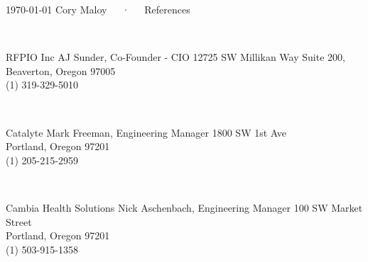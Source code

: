\documentclass[11pt, a4paper]{setup-class}
\begin{document}
\makecvheader[R]

\makecvfooter
  {\today}
  {Cory Maloy~~~·~~~References}
  {}

\makelettertitle

\begin{cvletter}


  ~

  \cventry
  {RFPIO Inc}
  {AJ Sunder, Co-Founder - CIO}
  {}
  {}
  {
	  12725 SW Millikan Way Suite 200, \\
	  Beaverton, Oregon 97005 \\
	  (1) 319-329-5010 \\
  }


  ~

  \cventry
  {Catalyte}
  {Mark Freeman, Engineering Manager}
  {}
  {}
  {
	  1800 SW 1st Ave \\
	  Portland, Oregon 97201 \\
	  (1) 205-215-2959 \\
  }


  ~

  \cventry
  {Cambia Health Solutions}
  {Nick Aschenbach, Engineering Manager}
  {}
  {}
  {
	  100 SW Market Street \\
	  Portland, Oregon 97201 \\
	  (1) 503-915-1358 \\
  }

  ~

\end{cvletter}
\end{document}
